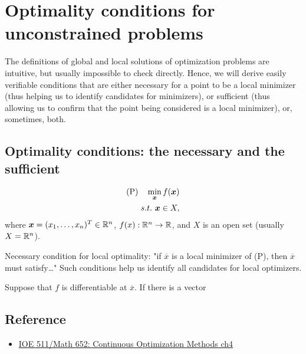 \chapter{Optimality conditions for unconstrained problems}

The definitions of global and local solutions of optimization problems are intuitive, 
but usually impossible to check directly. 
Hence, we will derive easily verifiable conditions that are either
necessary for a point to be a local minimizer (thus helping us to identify candidates for minimizers),
or sufficient (thus allowing us to confirm that the point being considered is a local minimizer), or,
sometimes, both.

\section{ Optimality conditions: the necessary and the sufficient}


\begin{align*}
    (\text{P})\quad \min_{\boldsymbol{x}} f(\boldsymbol{x})\\
    s.t.\  \boldsymbol{x}\in X,
\end{align*}
where $\boldsymbol{x}=(x_1,\dots,x_n)^T\in\mathbb{R}^n$, $f(x):\mathbb{R}^n\rightarrow\mathbb{R}$, and $X$ is an open set (usually $X=\mathbb{R}^n$).

Necessary condition for local optimality: "if $\overline{x}$ is a local minimizer of (P), 
then $\overline{x}$ must satisfy\dots"
Such conditions help us identify all candidates for local optimizers.

\begin{theorem}{}{}
    Suppose that $f$ is differentiable at $\overline{x}$. If there is a vector 
\end{theorem}


\section{Reference}
\begin{itemize}
    \item \href{}{IOE 511/Math 652: Continuous Optimization Methods ch4}
\end{itemize}